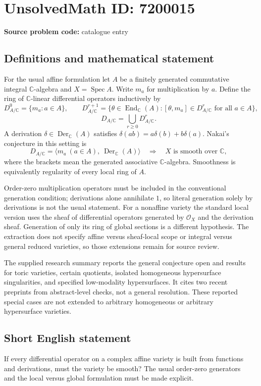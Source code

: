 \documentclass[11pt]{article}
\newcommand{\C}{\mathbb{C}}
\begin{document}
\section*{UnsolvedMath ID: 7200015}
\textbf{Source problem code:} catalogue entry
\subsection{Definitions and mathematical statement}
For the usual affine formulation let \(A\) be a finitely generated commutative integral \(\C\)-algebra and \(X=\operatorname{Spec}A\). Write \(m_a\) for multiplication by \(a\). Define the ring of \(\C\)-linear differential operators inductively by
\[
D^0_{A/\C}=\{m_a:a\in A\},\qquad
D^{r+1}_{A/\C}=\{\theta\in\operatorname{End}_{\C}(A):
 [\theta,m_a]\in D^r_{A/\C}\text{ for all }a\in A\},
\]
\[
D_{A/\C}=\bigcup_{r\ge0}D^r_{A/\C}.
\]
A derivation \(\delta\in\operatorname{Der}_{\C}(A)\) satisfies \(\delta(ab)=a\delta(b)+b\delta(a)\). Nakai's conjecture in this setting is
\[
D_{A/\C}=\langle m_a\ (a\in A),\ \operatorname{Der}_{\C}(A)\rangle
\quad\Longrightarrow\quad X\text{ is smooth over }\C,
\]
where the brackets mean the generated associative \(\C\)-algebra. Smoothness is equivalently regularity of every local ring of \(A\).

Order-zero multiplication operators must be included in the conventional generation condition; derivations alone annihilate \(1\), so literal generation solely by derivations is not the usual statement. For a nonaffine variety the standard local version uses the sheaf of differential operators generated by \(\mathcal O_X\) and the derivation sheaf. Generation of only its ring of global sections is a different hypothesis. The extraction does not specify affine versus sheaf-local scope or integral versus general reduced varieties, so those extensions remain for source review.

The supplied research summary reports the general conjecture open and results for toric varieties, certain quotients, isolated homogeneous hypersurface singularities, and specified low-modality hypersurfaces. It cites two recent preprints from abstract-level checks, not a general resolution. These reported special cases are not extended to arbitrary homogeneous or arbitrary hypersurface varieties.
\subsection{Short English statement}
If every differential operator on a complex affine variety is built from functions and derivations, must the variety be smooth? The usual order-zero generators and the local versus global formulation must be made explicit.
\end{document}
